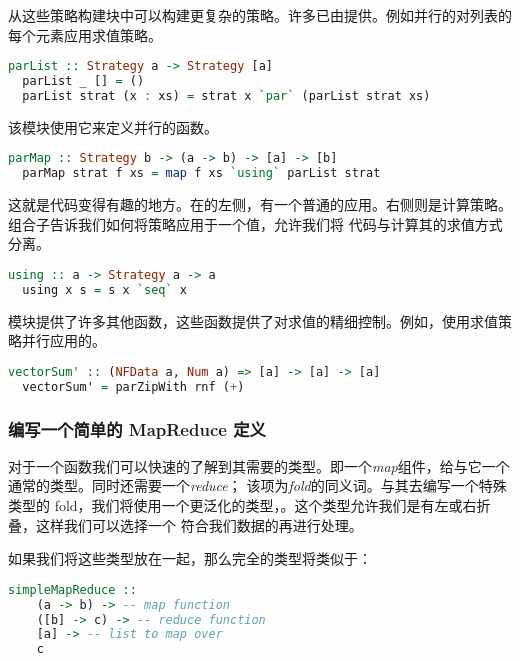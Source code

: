 \documentclass[./main.tex]{subfiles}
\begin{document}
从这些策略构建块中可以构建更复杂的策略。许多已由提供。例如并行的对列表的每个元素应用求值策略。

\begin{lstlisting}[language=Haskell]
  parList :: Strategy a -> Strategy [a]
  parList _ [] = ()
  parList strat (x : xs) = strat x `par` (parList strat xs)
\end{lstlisting}

该模块使用它来定义并行的函数。

\begin{lstlisting}[language=Haskell]
  parMap :: Strategy b -> (a -> b) -> [a] -> [b]
  parMap strat f xs = map f xs `using` parList strat
\end{lstlisting}

这就是代码变得有趣的地方。在的左侧，有一个普通的应用。右侧则是计算策略。组合子告诉我们如何将策略应用于一个值，允许我们将
代码与计算其的求值方式分离。

\begin{lstlisting}[language=Haskell]
  using :: a -> Strategy a -> a
  using x s = s x `seq` x
\end{lstlisting}

模块提供了许多其他函数，这些函数提供了对求值的精细控制。例如，使用求值策略并行应用的。

\begin{lstlisting}[language=Haskell]
  vectorSum' :: (NFData a, Num a) => [a] -> [a] -> [a]
  vectorSum' = parZipWith rnf (+)
\end{lstlisting}

\subsubsection*{编写一个简单的 MapReduce 定义}

对于一个函数我们可以快速的了解到其需要的类型。即一个\textit{map}组件，给与它一个通常的类型。同时还需要一个\textit{reduce}；
该项为\textit{fold}的同义词。与其去编写一个特殊类型的 fold，我们将使用一个更泛化的类型，。这个类型允许我们是有左或右折叠，这样我们可以选择一个
符合我们数据的再进行处理。

如果我们将这些类型放在一起，那么完全的类型将类似于：

\begin{lstlisting}[language=Haskell]
  simpleMapReduce ::
    (a -> b) -> -- map function
    ([b] -> c) -> -- reduce function
    [a] -> -- list to map over
    c
\end{lstlisting}
\end{document}
